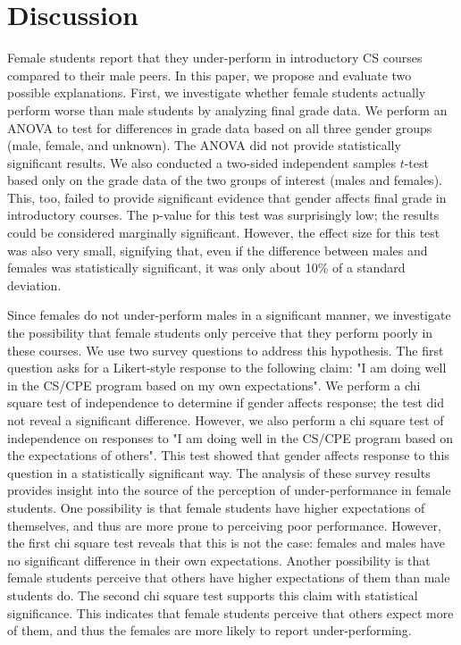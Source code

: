 \documentclass[a4paper,man,natbib]{apa6}
\begin{document}
\section{Discussion}
Female students report that they under-perform in introductory CS courses
compared to their male peers. In this paper, we propose and evaluate two
possible explanations. First, we investigate whether female students actually
perform worse than male students by analyzing final grade data. We perform an
ANOVA to test for differences in grade data based on all three gender groups
(male, female, and unknown). The ANOVA did not provide statistically
significant results. We also conducted a two-sided independent samples $t$-test
based only on the grade data of the two groups of interest (males and females).
This, too, failed to provide significant evidence that gender affects final
grade in introductory courses. The p-value for this test was surprisingly low;
the results could be considered marginally significant. However, the effect
size for this test was also very small, signifying that, even if the difference
between males and females was statistically significant, it was only about 10\%
of a standard deviation.

Since females do not under-perform males in a significant manner, we
investigate the possibility that female students only perceive that they perform
poorly in these courses. We use two survey questions to address this
hypothesis. The first question asks for a Likert-style response to the
following claim: "I am doing well in the CS/CPE program based on my own
expectations". We perform a chi square test of independence to determine if
gender affects response; the test did not reveal a significant difference.
However, we also perform a chi square test of independence on responses to "I am
doing well in the CS/CPE program based on the expectations of others". This
test showed that gender affects response to this question in a statistically
significant way. The analysis of these survey results provides insight into the
source of the perception of under-performance in female students. One
possibility is that female students have higher expectations of themselves, and
thus are more prone to perceiving poor performance. However, the first chi
square test reveals that this is not the case: females and males have no
significant difference in their own expectations. Another possibility is that
female students perceive that others have higher expectations of them than male
students do. The second chi square test supports this claim with statistical
significance. This indicates that female students perceive that others expect more of
them, and thus the females are more likely to report under-performing.
\end{document}
